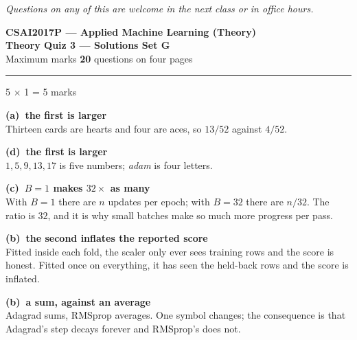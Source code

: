 \documentclass[10pt,a4paper]{article}
\newcommand{\SetLetter}{}
\newcommand{\parthead}[2]{\vspace{2pt}\noindent\rule{\linewidth}{0.4pt}\par\vspace{2pt}%
  \noindent{\bfseries Part #1}\hfill{\small #2}\par\vspace{1pt}}
\newcommand{\sol}[1]{\textbf{#1}}
\begin{document}
{\footnotesize\itshape Questions on any of this are welcome in the next class or in office hours.}

\newpage


\renewcommand{\SetLetter}{G}\setcounter{page}{1}

\begin{center}
{\large\bfseries CSAI2017P --- Applied Machine Learning (Theory)}\\[2pt]
{\large\bfseries Theory Quiz 3 --- Solutions \quad\textbullet\quad Set G}\\[3pt]
{\small Maximum marks \textbf{20} \quad\textbullet{} questions on four pages}
\end{center}
\vspace{2pt}

\noindent{}
\vspace{3pt}


\parthead{A --- Multiple choice}{5 $\times$ 1 = 5 marks}

\begin{sA}

  \item \sol{(a)\ the first is larger}\\ Thirteen cards are hearts and four are aces, so $13/52$ against $4/52$.

  \item \sol{(d)\ the first is larger}\\ $1, 5, 9, 13, 17$ is five numbers; \emph{adam} is four letters.

  \item \sol{(c)\ $B=1$ makes $32\times$ as many}\\ With $B=1$ there are $n$ updates per epoch; with $B=32$ there are $n/32$. The ratio is $32$, and it is why small batches make so much more progress per pass.

  \item \sol{(b)\ the second inflates the reported score}\\ Fitted inside each fold, the scaler only ever sees training rows and the score is honest. Fitted once on everything, it has seen the held-back rows and the score is inflated.

  \item \sol{(b)\ a sum, against an average}\\ Adagrad sums, RMSprop averages. One symbol changes; the consequence is that Adagrad's step decays forever and RMSprop's does not.

\end{sA}
\end{document}
